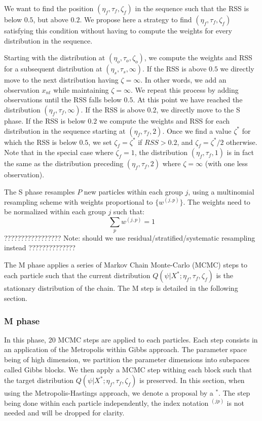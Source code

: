 \documentclass[12pt]{article}
\begin{document}
We want to find the position $(\eta_f,\tau_f,\zeta_f)$ in the sequence such that the RSS is below $0.5$, but above $0.2$. We propose here a strategy to find $(\eta_f,\tau_f,\zeta_f)$ satisfying this condition without having to compute the weights for every distribution in the sequence.

Starting with the distribution at $(\eta_o,\tau_o,\zeta_o)$, we compute the weights and RSS for a subsequent distribution at $(\eta_s,\tau_s,\infty)$. If the RSS is above $0.5$ we directly move to the next distribution having $\zeta=\infty$. In other words, we add an observation $x_{nt}$ while maintaining $\zeta=\infty$. We repeat this process by adding observations until the RSS falls below $0.5$. At this point we have reached the distribution $(\eta_f,\tau_f,\infty)$. If the RSS is above $0.2$, we directly move to the S phase. If the RSS is below $0.2$ we compute the weights and RSS for each distribution in the sequence starting at $(\eta_f,\tau_f,2)$. Once we find a value $\zeta^*$ for which the RSS is below $0.5$, we set $\zeta_f=\zeta^*$ if $RSS > 0.2$, and $\zeta_f=\zeta^*/2$ otherwise. Note that in the special case where $\zeta_f=1$, the distribution $(\eta_f,\tau_f,1)$ is in fact the same as the distribution preceding $(\eta_f,\tau_f,2)$ where $\zeta=\infty$ (with one less observation).

The S phase resamples $P$ new particles within each group $j$, using a multinomial resampling scheme with weights proportional to $\{ w^{(j,p)}\}$. The weights need to be normalized within each group $j$ such that:
$$ \sum_p  w^{(j,p)} = 1 $$ 
????????????????? Note: should we use residual/stratified/systematic resampling instead ??????????????

The M phase applies a series of Markov Chain Monte-Carlo (MCMC) steps to each particle such that the current distribution $Q(\psi|X^*;\eta_f,\tau_f,\zeta_f)$ is the stationary distribution of the chain. The M step is detailed in the following section.

\subsubsection{M phase}

In this phase, 20 MCMC steps are applied to each particles. Each step consists in an application of the Metropolis within Gibbs approach. The parameter space being of high dimension, we partition the parameter dimensions into subspaces called Gibbs blocks. We then apply a MCMC step withing each block such that the target distribution $Q(\psi|X^*;\eta_f,\tau_f,\zeta_f)$ is preserved. In this section, when using the Metropolis-Hastings approach, we denote a proposal by a ${}^*$. The step being done within each particle independently, the index notation ${}^{(jp)}$ is not needed and will be dropped for clarity.
\end{document}
